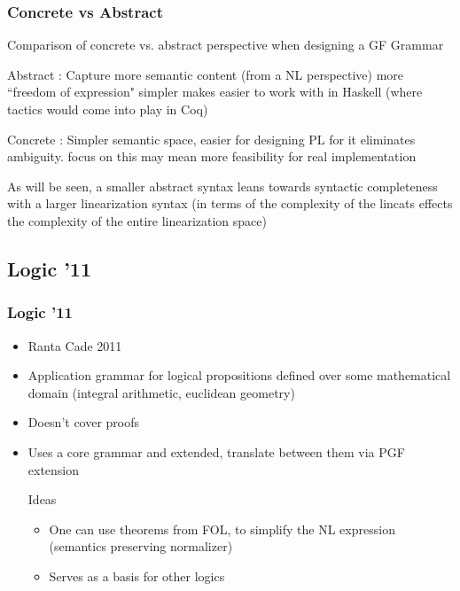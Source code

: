 \documentclass[10pt]{beamer}
\begin{document}
\begin{frame}
\frametitle{Concrete vs Abstract}

Comparison of concrete vs. abstract perspective when designing a GF Grammar

Abstract : Capture more semantic content (from a NL perspective) more ``freedom
of expression"
simpler makes easier to work with in Haskell (where tactics would come into play
in Coq)

Concrete : Simpler semantic space, easier for designing PL for it eliminates ambiguity.
focus on this may mean more feasibility  for real implementation

As will be seen, a smaller abstract syntax leans towards syntactic completeness
with a larger linearization syntax (in terms of the complexity of the lincats
effects the complexity of the entire linearization space)

\end{frame}

\subsection{Logic '11}

\begin{frame}
\frametitle{Logic '11}

\begin{itemize}
\item Ranta Cade 2011
\item Application grammar for logical propositions defined over some mathematical
domain (integral arithmetic, euclidean geometry)
\item Doesn't cover proofs
\item Uses a core grammar and extended, translate between them via PGF extension


\begin{exampleblock}{Ideas}
\begin{itemize}
\item One can use theorems from FOL, to simplify the
NL expression (semantics preserving normalizer)
\item Serves as a basis for other logics
\end{itemize}
\end{exampleblock}



\end{itemize}

\end{frame}
\end{document}
